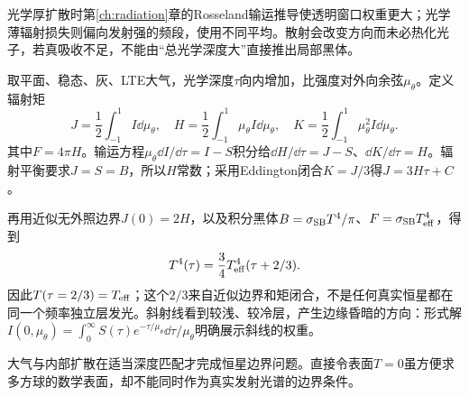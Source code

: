 光学厚扩散时第\ref{ch:radiation}章的Rosseland输运推导使透明窗口权重更大；光学薄辐射损失则偏向发射强的频段，使用不同平均。散射会改变方向而未必热化光子，若真吸收不足，不能由“总光学深度大”直接推出局部黑体。

取平面、稳态、灰、LTE大气，光学深度$\tau$向内增加，比强度对外向余弦$\mu_\theta$。定义辐射矩
\[
 J=\frac12\int_{-1}^1I\dd\mu_\theta,\quad
 H=\frac12\int_{-1}^1\mu_\theta I\dd\mu_\theta,\quad
 K=\frac12\int_{-1}^1\mu_\theta^2I\dd\mu_\theta .
\]
其中$F=4\pi H$。输运方程$\mu_\theta\dd I/\dd\tau=I-S$积分给$\dd H/\dd\tau=J-S$、$\dd K/\dd\tau=H$。辐射平衡要求$J=S=B$，所以$H$常数；采用Eddington闭合$K=J/3$得$J=3H\tau+C$。

再用近似无外照边界$J(0)=2H$，以及积分黑体$B=\sigma_{\rm SB}T^4/\pi$、$F=\sigma_{\rm SB}T_{\rm eff}^4$，得到
\[
 T^4(\tau)=\frac34T_{\rm eff}^4(\tau+2/3).
\]
因此$T(\tau=2/3)=T_{\rm eff}$；这个$2/3$来自近似边界和矩闭合，不是任何真实恒星都在同一个频率独立层发光。斜射线看到较浅、较冷层，产生边缘昏暗的方向：形式解$I(0,\mu_\theta)=\int_0^\infty S(\tau)e^{-\tau/\mu_\theta}\dd\tau/\mu_\theta$明确展示斜线的权重。

大气与内部扩散在适当深度匹配才完成恒星边界问题。直接令表面$T=0$虽方便求多方球的数学表面，却不能同时作为真实发射光谱的边界条件。
